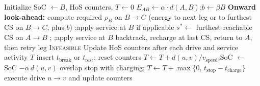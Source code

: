 \documentclass[3p,11pt,authoryear]{elsarticle}  %
\begin{document}
\begin{algorithm}[H]
{\color{red}
\caption{Sequential myopic scheduling heuristic}
\label{alg:myopic_alt}
\small
\begin{algorithmic}[1]
\State Initialize SoC $\leftarrow B$, HoS counters, $T \leftarrow 0$
    \State $E_{AB} \leftarrow \alpha \cdot d(A,B)$;\quad $b \leftarrow \beta B$
    \State \textbf{Onward look-ahead:} compute required $\rho_B$ on $B\!\rightarrow\!C$
           (energy to next leg or to furthest CS on $B\!\rightarrow\!C$, plus $b$)
        \State {};\quad apply service at $B$ if applicable
        \State $s^\ast \leftarrow$ furthest reachable CS on $A\!\rightarrow\!B$
        \State {};\quad {}
        \State {};\quad apply service at $B$
        \State backtrack, recharge at last CS, return to $A$, then retry leg
    \Else
        \State \Return \textsc{Infeasible}
    \EndIf
    \State Update HoS counters after each drive and service activity
\EndFor
\State \Return $T$
        \State insert $t_{\text{break}}$ or $t_{\text{rest}}$; reset counters
    \EndIf
    \State $T \leftarrow T + d(u,v)/v_{\text{speed}}$;\quad SoC $\leftarrow$ SoC $- \alpha\,d(u,v)$
\EndProcedure
{}
        \State overlap stop with charging; $T \leftarrow T + \max\{0,\, t_{\text{stop}} - t_{\text{charge}}\}$
    \EndIf
    \State execute drive $u \rightarrow v$ and update counters
\EndProcedure
\end{algorithmic}
}
\end{algorithm} 
\end{document}
